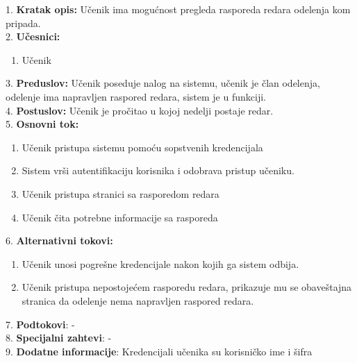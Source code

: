 \documentclass{article}
\begin{document}
1. \textbf{Kratak opis:} Učenik ima mogućnost pregleda rasporeda redara odelenja kom pripada. \\

2. \textbf{Učesnici:}
\begin{enumerate} [label=(\alph*)]
\item Učenik
\end{enumerate} 

3. \textbf{Preduslov:} Učenik poseduje nalog na sistemu, učenik je član odelenja, odelenje ima napravljen raspored redara, sistem je u funkciji. \\

4. \textbf{Postuslov:} Učenik je pročitao u kojoj nedelji postaje redar. \\

5. \textbf{Osnovni tok:} 
\begin{enumerate} [label=(\alph*)]
\item Učenik pristupa sistemu pomoću sopstvenih kredencijala
\item Sistem vrši autentifikaciju korisnika i odobrava pristup učeniku.
\item Učenik pristupa stranici sa rasporedom redara
\item Učenik čita potrebne informacije sa rasporeda
\end{enumerate}


6. \textbf{Alternativni tokovi:}
\begin{enumerate} [label=(\roman*)]
\item Učenik unosi pogrešne kredencijale nakon kojih ga sistem odbija.
\item Učenik pristupa nepostojećem rasporedu redara, prikazuje mu se obaveštajna stranica da odelenje nema napravljen raspored redara.
\end{enumerate}

7. \textbf{Podtokovi}: - \\

8. \textbf{Specijalni zahtevi}: - \\

9. \textbf{Dodatne informacije}: Kredencijali učenika su korisničko ime i šifra  \\
\end{document}
